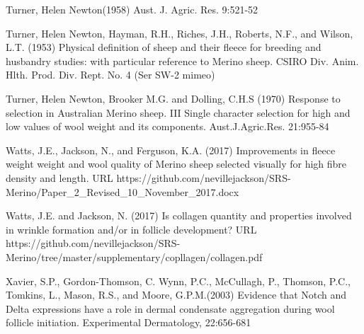 \documentclass[titlepage]{article}  %
\begin{document}
\begin{thebibliography}{99}
Turner, Helen Newton(1958) Aust. J. Agric. Res. 9:521-52

Turner, Helen Newton, Hayman, R.H., Riches, J.H., Roberts, N.F., and Wilson, L.T. (1953) Physical definition of sheep and their fleece for breeding and husbandry studies: with particular reference to Merino sheep. CSIRO Div. Anim. Hlth. Prod. Div. Rept. No. 4 (Ser SW-2 mimeo)

Turner, Helen Newton, Brooker M.G. and Dolling, C.H.S (1970) Response to selection in Australian Merino sheep. III Single character selection for high and low values of wool weight and its components. Aust.J.Agric.Res. 21:955-84

Watts, J.E., Jackson, N., and Ferguson, K.A. (2017) Improvements in fleece weight weight and wool quality of Merino sheep selected visually for high fibre density and length. URL https://github.com/nevillejackson/SRS-Merino/Paper\_2\_Revised\_10\_November\_2017.docx 

Watts, J.E. and Jackson, N. (2017) Is collagen quantity and properties involved in wrinkle formation and/or in follicle development? URL https://github.com/nevillejackson/SRS-Merino/tree/master/supplementary/copllagen/collagen.pdf

Xavier, S.P., Gordon-Thomson, C. Wynn, P.C., McCullagh, P., Thomson, P.C., Tomkins, L., Mason, R.S., and Moore, G.P.M.(2003) Evidence that Notch and Delta expressions have a role in dermal condensate aggregation during wool follicle initiation. Experimental Dermatology, 22:656-681

\end{thebibliography}
\end{document}
